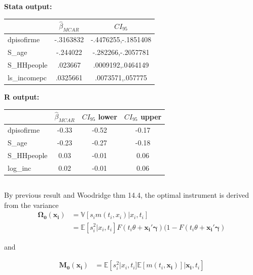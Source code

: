 \documentclass[12pt]{article}
\newcommand{\E}{\mathbb{E}}
\newcommand{\V}{\mathbb{V}}
\begin{document}
\subsubsection{}

\textbf{Stata output:}\\


\begin{tabular}{lcc}
\hline
&           $\hat \beta_{MCAR}$&     $CI_{95}$\\
\hline
dpisofirme  &   -.3163832&-.4476255,-.1851408\\
S\_age       &    -.244022&-.282266,-.2057781\\
S\_HHpeople  &     .023667&.0009192,.0464149\\
ls\_incomepc &    .0325661&.0073571,.057775\\
\end{tabular}

\vspace{1cm}
\textbf{R output:}\\

\begin{tabular}{lccc}
\hline
 & $\hat \beta_{MCAR}$  & $CI_{95}$ lower & $CI_{95}$ upper \\
  \hline
dpisofirme & -0.33 &  -0.52 & -0.17 \\
  S\_age & -0.23 &  -0.27 & -0.18 \\
  S\_HHpeople & 0.03 & -0.01 & 0.06 \\
  log\_inc & 0.02 &  -0.01 & 0.06 \\
   \hline
\end{tabular}

\subsection{}

\subsubsection{}
By previous result and Woodridge thm 14.4, the optimal instrument is derived from the variance
\begin{align*}
  \mathbf{\Omega_0(x_i)} &= \V[s_i m(t_i,x_i)|x_i,t_i]\\
  & = \E[s_i^2|x_i,t_i]F(t_i\theta+\mathbf{x_i'\gamma})(1-F(t_i\theta+\mathbf{x_i'\gamma})
\end{align*}

and

\begin{align*}
  \mathbf{M_0(x_i)} &=  \E[s_i^2|x_i,t_i]\E[m(t_i,\mathbf{x_i})]|\mathbf{x_i},t_i]
\end{align*}
\end{document}
